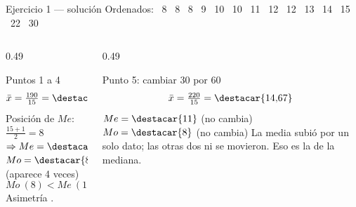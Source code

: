 \documentclass[aspectratio=169,10pt]{beamer}
\begin{document}
\begin{frame}{Ejercicio 1 — solución}
  \scriptsize
  Ordenados:  \ 8 \ 8 \ 8 \ 9 \ 10 \ 10 \ 11 \ 12 \ 12 \ 13 \ 14
  \ 15 \ 22 \ 30 \rmfamily

  \vspace{0.1cm}
  \begin{columns}[T,onlytextwidth]
    \begin{column}{0.49\textwidth}
      \begin{block}{Puntos 1 a 4}
        \scriptsize
        \[ \bar{x} = \tfrac{190}{15} = \destacar{12{,}67} \]
        Posición de $Me$: $\frac{15+1}{2} = 8$ \\
        $\Rightarrow Me = \destacar{11}$ \\
        $Mo = \destacar{8}$ (aparece 4 veces)
        \vspace{0.1cm}
        \[ Mo\ (8) < Me\ (11) < \bar{x}\ (12{,}67) \]
        Asimetría .
      \end{block}
    \end{column}
    \begin{column}{0.49\textwidth}
      \begin{exampleblock}{Punto 5: cambiar 30 por 60}
        \scriptsize
        \[ \bar{x} = \tfrac{220}{15} = \destacar{14{,}67} \]
        $Me = \destacar{11}$ (no cambia) \\
        $Mo = \destacar{8}$ (no cambia)
        \vspace{0.1cm}
        La media subió  por un solo dato; las otras dos
        ni se movieron. Eso es la  de la mediana.
      \end{exampleblock}
    \end{column}
  \end{columns}
\end{frame}

\end{document}
